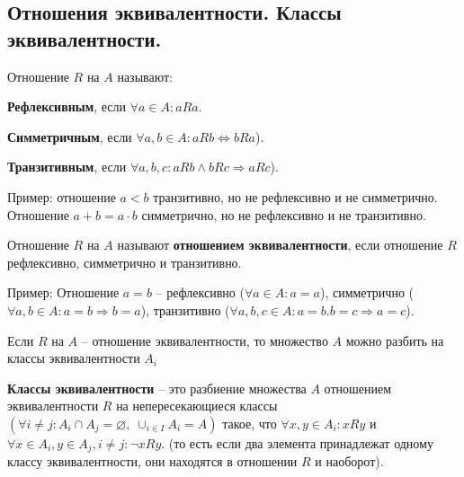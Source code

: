 \subsection{Отношения эквивалентности. Классы эквивалентности.}

Отношение $R$ на $A$ называют:

\textbf{Рефлексивным}, если $\forall a \in A \colon aRa$.

\textbf{Симметричным}, если $\forall a, b \in A \colon aRb \Leftrightarrow bRa$).

\textbf{Транзитивным}, если $\forall a, b, c \colon aRb \wedge bRc \Rightarrow aRc$).

Пример: отношение $a < b$ транзитивно, но не рефлексивно и не симметрично. Отношение $a + b = a \cdot b$ симметрично, но не рефлексивно и не транзитивно.

Отношение $R$ на $A$ называют \textbf{отношением эквивалентности}, если отношение $R$ рефлексивно, симметрично и транзитивно.

Пример: Отношение $a = b$ -- рефлексивно ($\forall a \in A \colon a = a$), симметрично ($\forall a, b \in A \colon a = b \Rightarrow b = a$), транзитивно ($\forall a, b, c \in A \colon a = b. b = c \Rightarrow a = c$).

Если $R$ на $A$ -- отношение эквивалентности, то множество $A$ можно разбить на классы эквивалентности $A_i$

\textbf{Классы эквивалентности} -- это разбиение множества $A$ отношением эквивалентности $R$ на непересекающиеся классы $(\forall i \neq j \colon A_i \cap A_j = \varnothing,\; \cup_{i \in I} A_i = A)$ такое, что $\forall x, y \in A_i \colon xRy$ и $\forall x \in A_i, y \in A_j, i \neq j: \neg xRy$. (то есть если два элемента принадлежат одному классу эквивалентности, они находятся в отношении $R$ и наоборот).
